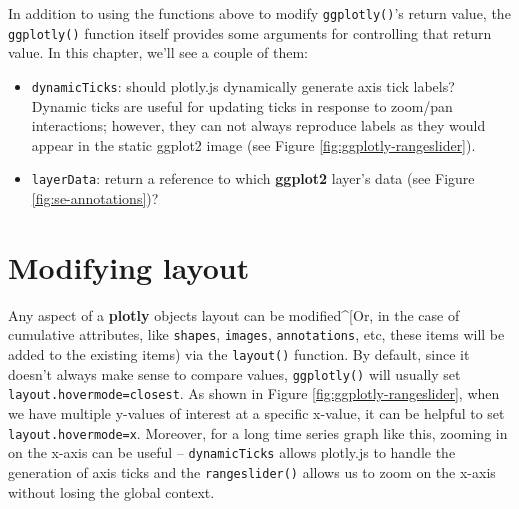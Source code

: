 \documentclass[
  12pt,
]{krantz}
\newenvironment{Shaded}{\begin{snugshade}}{\end{snugshade}}
\newcommand{\DataTypeTok}[1]{\textcolor[rgb]{0.13,0.29,0.53}{#1}}
\newcommand{\KeywordTok}[1]{\textcolor[rgb]{0.13,0.29,0.53}{\textbf{#1}}}
\newcommand{\NormalTok}[1]{#1}
\newcommand{\OperatorTok}[1]{\textcolor[rgb]{0.81,0.36,0.00}{\textbf{#1}}}
\newcommand{\OtherTok}[1]{\textcolor[rgb]{0.56,0.35,0.01}{#1}}
\newcommand{\StringTok}[1]{\textcolor[rgb]{0.31,0.60,0.02}{#1}}
\providecommand{\tightlist}{%
  \setlength{\itemsep}{0pt}\setlength{\parskip}{0pt}}
\begin{document}
In addition to using the functions above to modify \texttt{ggplotly()}'s return value, the \texttt{ggplotly()} function itself provides some arguments for controlling that return value. In this chapter, we'll see a couple of them:

\begin{itemize}
\tightlist
\item
  \texttt{dynamicTicks}: should plotly.js dynamically generate axis tick labels? Dynamic ticks are useful for updating ticks in response to zoom/pan interactions; however, they can not always reproduce labels as they would appear in the static ggplot2 image (see Figure \ref{fig:ggplotly-rangeslider}).
\item
  \texttt{layerData}: return a reference to which \textbf{ggplot2} layer's data (see Figure \ref{fig:se-annotations})?
\end{itemize}

\hypertarget{modifying-layout}{%
\section{Modifying layout}\label{modifying-layout}}

Any aspect of a \textbf{plotly} objects layout can be modified\^{}{[}Or, in the case of cumulative attributes, like \texttt{shapes}, \texttt{images}, \texttt{annotations}, etc, these items will be added to the existing items) via the \texttt{layout()} function. By default, since it doesn't always make sense to compare values, \texttt{ggplotly()} will usually set \texttt{layout.hovermode=\textquotesingle{}closest\textquotesingle{}}. As shown in Figure \ref{fig:ggplotly-rangeslider}, when we have multiple y-values of interest at a specific x-value, it can be helpful to set \texttt{layout.hovermode=\textquotesingle{}x\textquotesingle{}}. Moreover, for a long time series graph like this, zooming in on the x-axis can be useful -- \texttt{dynamicTicks} allows plotly.js to handle the generation of axis ticks and the \texttt{rangeslider()} allows us to zoom on the x-axis without losing the global context.

\begin{Shaded}
\end{Shaded}
\end{document}

